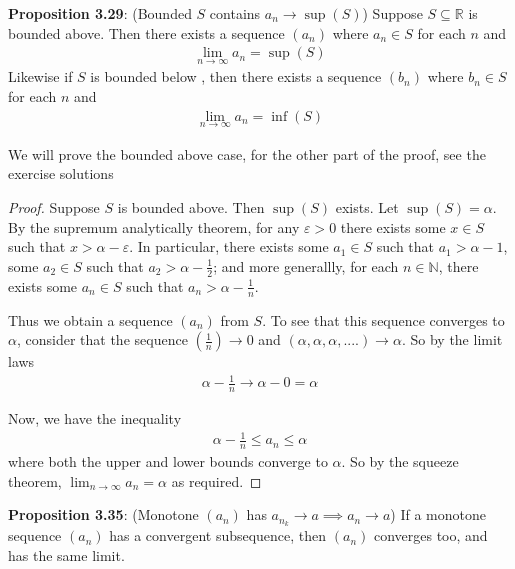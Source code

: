 \documentclass{article}
\begin{document}
\textbf{Proposition 3.29}: (Bounded $S$ contains $a_n \rightarrow \sup(S)$) Suppose $S \subseteq \mathbb{R}$ is bounded above.
Then there exists a sequence $(a_n)$ where $a_n \in S$ for each $n$ and
\begin{align*}
	\lim_{n \rightarrow \infty} a_n = \sup (S)
\end{align*}
Likewise if $S$ is bounded below , then there exists a sequence $(b_n)$ where $b_n \in S$ for each $n$ and
\begin{align*}
	\lim_{n \rightarrow \infty} a_n = \inf (S)
\end{align*}

We will prove the bounded above case, for the other part of the proof, see the exercise solutions
\begin{proof}
	Suppose $S$ is bounded above. Then $\sup(S)$ exists. Let $\sup(S) = \alpha$. By the supremum analytically theorem,
	for any $\varepsilon > 0$ there exists some $x \in S$ such that $x > \alpha - \varepsilon$. In particular, there exists
	some $a_1 \in S$ such that $a_1 > \alpha - 1$, some $a_2 \in S$ such that $a_2 > \alpha - \frac{1}{2}$; and more generallly,
	for each $n \in \mathbb{N}$, there exists some $a_n \in S$ such that $a_n > \alpha - \frac{1}{n}$.

	Thus we obtain a sequence $(a_n)$ from $S$. To see that this sequence converges to $\alpha$, consider that the
	sequence $(\frac{1}{n}) \rightarrow 0$ and $(\alpha, \alpha, \alpha, ....) \rightarrow \alpha$. So by the limit laws
	\begin{align*}
		\alpha - \frac{1}{n} \rightarrow \alpha - 0 = \alpha
	\end{align*}

	Now, we have the inequality
	\begin{align*}
		\alpha - \frac{1}{n} \le a_n \le \alpha
	\end{align*}
	where both the upper and lower bounds converge to $\alpha$. So by the squeeze theorem, $\lim_{n \rightarrow \infty} a_n = \alpha$
	as required.
\end{proof}

\textbf{Proposition 3.35}: (Monotone $(a_n)$ has $a_{n_k} \rightarrow a \implies a_n \rightarrow a$) If a monotone sequence
$(a_n)$ has a convergent subsequence, then $(a_n)$ converges too, and has the same limit.
\end{document}
